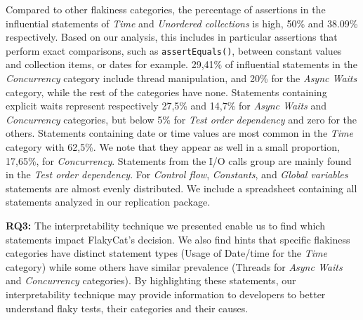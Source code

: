 Compared to other flakiness categories, the percentage of assertions in the influential statements of \textit{Time} and \textit{Unordered collections} is high, 50\% and 38.09\% respectively. Based on our analysis, this includes in particular assertions that perform exact comparisons, such as \texttt{assertEquals()}, between constant values and collection items, or dates for example. 
29,41\% of influential statements in the \textit{Concurrency} category include thread manipulation, and 20\% for the \textit{Async Waits} category, while the rest of the categories have none. 
Statements containing explicit waits represent respectively 27,5\% and 14,7\% for \textit{Async Waits} and \textit{Concurrency} categories, but below 5\% for \textit{Test order dependency} and zero for the others. Statements containing date or time values are most common in the \textit{Time} category with 62,5\%. We note that they appear as well in a small proportion, 17,65\%, for \textit{Concurrency}. Statements from the I/O calls group are mainly found in the \textit{Test order dependency}.
For \textit{Control flow}, \textit{Constants}, and \textit{Global variables} statements are almost evenly distributed. We include a spreadsheet containing all statements analyzed in our replication package. 

\begin{tcolorbox}[
    left=2pt,right=2pt,top=2pt,bottom=2pt, 
    arc=0pt, 
    boxrule=1.2pt 
]
\textbf{RQ3:} The interpretability technique we presented enable us to find which statements impact FlakyCat's decision. We also find hints that specific flakiness categories have distinct statement types (\eg Usage of Date/time for the \textit{Time} category) while some others have similar prevalence (\eg Threads for \textit{Async Waits} and \textit{Concurrency} categories).
By highlighting these statements, our interpretability technique may provide information to developers to better understand flaky tests, their categories and their causes.
\end{tcolorbox}
